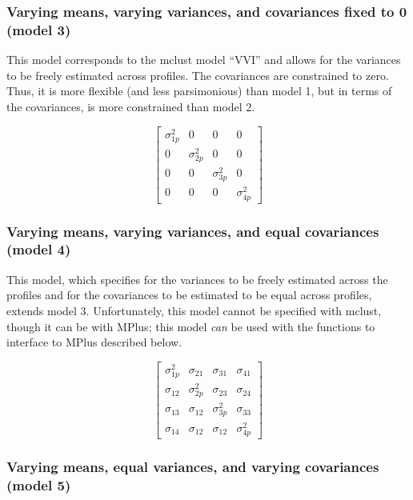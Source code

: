 \documentclass[]{book}
\theoremstyle{definition}
\theoremstyle{definition}
\theoremstyle{definition}
\theoremstyle{remark}
\begin{document}
\subsubsection{Varying means, varying variances, and covariances fixed
to 0 (model
3)}\label{varying-means-varying-variances-and-covariances-fixed-to-0-model-3}

This model corresponds to the mclust model ``VVI'' and allows for the
variances to be freely estimated across profiles. The covariances are
constrained to zero. Thus, it is more flexible (and less parsimonious)
than model 1, but in terms of the covariances, is more constrained than
model 2.

\[ 
\left[ \begin{matrix} { \sigma  }_{ 1p }^{ 2 } & 0 & 0 & 0 \\ 0 & { \sigma  }_{ 2p }^{ 2 } & 0 & 0 \\ 0 & 0 & { \sigma  }_{ 3p }^{ 2 } & 0 \\ 0 & 0 & 0 & { \sigma  }_{ 4p }^{ 2 } \end{matrix} \right] 
\]

\subsubsection{Varying means, varying variances, and equal covariances
(model
4)}\label{varying-means-varying-variances-and-equal-covariances-model-4}

This model, which specifies for the variances to be freely estimated
across the profiles and for the covariances to be estimated to be equal
across profiles, extends model 3. Unfortunately, this model cannot be
specified with mclust, though it can be with MPlus; this model
\emph{can} be used with the functions to interface to MPlus described
below.

\[
\left[ \begin{matrix} { \sigma  }_{ 1p }^{ 2 } & { \sigma  }_{ 21 } & { \sigma  }_{ 31 } & { \sigma  }_{ 41 } \\ { \sigma  }_{ 12 } & { \sigma  }_{ 2p }^{ 2 } & { \sigma  }_{ 23 } & { \sigma  }_{ 24 } \\ { \sigma  }_{ 13 } & { \sigma  }_{ 12 } & { \sigma  }_{ 3p }^{ 2 } & { \sigma  }_{ 33 } \\ { \sigma  }_{ 14 } & { \sigma  }_{ 12 } & { \sigma  }_{ 12 } & { \sigma  }_{ 4p }^{ 2 } \end{matrix} \right] 
\]

\subsubsection{Varying means, equal variances, and varying covariances
(model
5)}\label{varying-means-equal-variances-and-varying-covariances-model-5}
\end{document}
